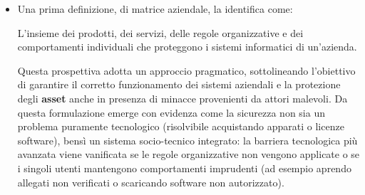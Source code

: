 \documentclass[../../main.tex]{subfiles}
\begin{document}
\begin{itemize}
    \item Una prima definizione, di matrice aziendale, la identifica come:
    \begin{definition}
    L'insieme dei prodotti, dei servizi, delle regole organizzative e dei comportamenti individuali che proteggono i sistemi informatici di un'azienda.
    \end{definition}
    Questa prospettiva adotta un approccio pragmatico, sottolineando l'obiettivo di garantire il corretto funzionamento dei sistemi aziendali e la protezione degli \textbf{asset} anche in presenza di minacce provenienti da attori malevoli. Da questa formulazione emerge con evidenza come la sicurezza non sia un problema puramente tecnologico (risolvibile acquistando apparati o licenze software), bensì un sistema socio-tecnico integrato: la barriera tecnologica più avanzata viene vanificata se le regole organizzative non vengono applicate o se i singoli utenti mantengono comportamenti imprudenti (ad esempio aprendo allegati non verificati o scaricando software non autorizzato).


\end{itemize}
\end{document}
